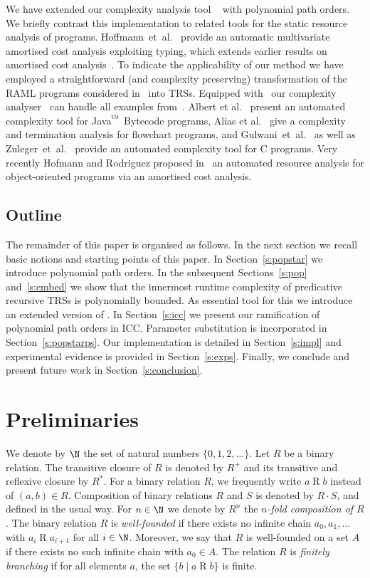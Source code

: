 \documentclass{LMCS}
\begin{document}
We have extended our complexity analysis tool \TCT~\cite{AM13b} with polynomial path orders.
We briefly contrast this implementation to related tools for the static resource analysis 
of programs.
Hoffmann~et~al.~\cite{HAH11} provide an automatic multivariate amortised 
cost analysis exploiting typing, which extends earlier results on amortised 
cost analysis~\cite{Tarjan:1985}.
To indicate the applicability of our method we have employed 
a straightforward (and complexity preserving) 
transformation of the RAML programs considered
in~\cite{HAH11,HAH12} into TRSs. Equipped with \POPSTAR\ our complexity
analyser \TCT\ can handle all examples from~\cite{HAH11}.
Albert et al.~\cite{AAGGPRRZ:2009} present an automated complexity tool
for Java${}^\text{\texttrademark}$ Bytecode programs, 
Alias et al.~\cite{ADFG10} give a complexity and
termination analysis for flowchart programs, and
Gulwani~et~al.~\cite{GMC09} as well as Zuleger~et~al.~\cite{ZulegerGSV11} 
provide an automated complexity tool for C programs.
Very recently Hofmann and Rodriguez proposed in~\cite{HR13} an 
automated resource analysis for object-oriented programs via an 
amortised cost analysis.

\subsection{Outline}
The remainder of this paper is organised as follows.
In the next section we recall basic notions and starting points of
this paper.
In Section~\ref{s:popstar} we introduce polynomial path orders.
In the subsequent Sections~\ref{s:pop} and~\ref{s:embed} we show that the 
innermost runtime complexity of predicative recursive TRSs is polynomially bounded.
As essential tool for this we introduce an extended version of \POPFP.
In Section~\ref{s:icc} we present our ramification of polynomial path orders in ICC.
Parameter substitution is incorporated in Section~\ref{s:popstarps}.
Our implementation is detailed in Section~\ref{s:impl} and experimental evidence 
is provided in Section~\ref{s:exps}. 
Finally, we conclude and present future work in Section~\ref{s:conclusion}.




\section{Preliminaries}\label{s:basics}

We denote by $\N$ the set of natural numbers $\{0,1,2,\dots\}$.
Let $R$ be a binary relation.
The transitive closure of $R$ is denoted by $R^+$ and its transitive and reflexive closure by $R^{\ast}$. 
For a binary relation $R$, we frequently write $a \mathrel{R} b$ instead of $(a,b) \in R$. 
Composition of binary relations $R$ and $S$ is denoted by $R \cdot S$,
and defined in the usual way.
For $n\in \N$ we denote by $R^n$ the \emph{$n$-fold composition of $R$}.
The binary relation $R$ is \emph{well-founded} if 
there exists no infinite chain $a_0, a_1, \dots$ with $a_i \mathrel{R} a_{i+1}$
for all $i \in \N$. Moreover, we say that $R$ is well-founded on a set $A$ if 
there exists no such infinite chain with $a_0 \in A$.
The relation $R$ is \emph{finitely branching} if for all elements $a$, the set $\{b \mid a \mathrel{R} b\}$ is finite.
\end{document}
